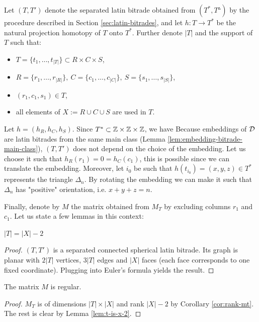 Let $(T,T')$ denote the separated latin bitrade obtained from $(T^*, T^\vartriangle)$ by the procedure described in Section \ref{sec:latin-bitrades}, and let $h:T \rightarrow T^*$ be the natural projection homotopy of $T$ onto $T^*$. Further denote $|T|$ and the support of $T$ such that:
\begin{itemize}
	\item $T = \{t_1, \dots, t_{|T|}\} \subset R \times C \times S$,
	\item $R = \{r_1,\dots,r_{|R|}\},\ 
		C = \{c_1,\dots,c_{|C|}\},\ 
		S = \{s_1,\dots,s_{|S|}\}$,
	\item $(r_1,c_1,s_1) \in T$,
	\item all elements of $X := R \cup C \cup S$ are used in $T$.
\end{itemize}%
Let $h = (h_R, h_C, h_S)$. Since $T^* \subset \mathbb Z \times \mathbb Z \times \mathbb Z$, we have
\cosyalign{
	h_R: R \rightarrow \Z,\ h_C: C \rightarrow \Z,\ h_S: S \rightarrow \Z.
}%
Because embeddings of $\mathcal D$ are latin bitrades from the same main class (Lemma \ref{lem:embedding-bitrade-main-class}), $(T,T')$ does not depend on the choice of the embedding. Let us choose it such that $h_R(r_1) = 0 = h_C(c_1)$, this is possible since we can translate the embedding. Moreover, let $i_0$ be such that $h(t_{i_0}) = (x,y,z) \in T^*$ represents the triangle $\Delta_n$. By rotating the embedding we can make it such that $\Delta_n$ has "positive" orientation, i.e. $x+y+z = n$.

Finally, denote by $M$ the matrix obtained from $M_T$ by excluding columns $r_1$ and $c_1$. Let us state a few lemmas in this context:

\begin{lem}
\label{lem:t-is-x-2}
$|T| = |X|-2$
\end{lem}
\begin{proof}
$(T, T')$ is a separated connected spherical latin bitrade. Its graph is planar with $2|T|$ vertices, $3|T|$ edges and $|X|$ faces (each face corresponds to one fixed coordinate). Plugging into Euler's formula yields the result.
\end{proof}

\begin{lem}
\label{lem:M-is-regular}
The matrix $M$ is regular.
\end{lem}
\begin{proof}
$M_T$ is of dimensions $|T|\times|X|$ and rank $|X|-2$ by Corollary \ref{cor:rank-mt}. The rest is clear by Lemma \ref{lem:t-is-x-2}.
\end{proof}

